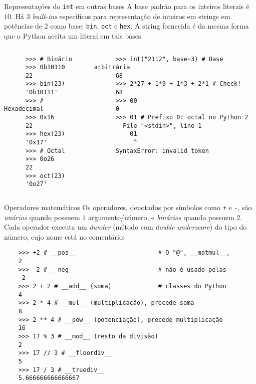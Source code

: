\documentclass[utf8]{beamer}
\begin{document}
\begin{frame}[fragile]{Representações do \texttt{int} em outras bases}
  A base padrão para os inteiros literais é $10$.
  Há $3$ \emph{built-ins} específicos
  para representação de inteiros em strings
  em potências de $2$ como base:
  \texttt{bin},
  \texttt{oct} e
  \texttt{hex}.
  A string fornecida é da mesma forma que o Python aceita
  um literal em tais bases.

  \begin{columns}

    \begin{verbatim}
      >>> # Binário
      >>> 0b10110
      22
      >>> bin(23)
      '0b10111'
      >>> # Hexadecimal
      >>> 0x16
      22
      >>> hex(23)
      '0x17'
      >>> # Octal
      >>> 0o26
      22
      >>> oct(23)
      '0o27'
    \end{verbatim}

    \begin{verbatim}
      >>> int("2112", base=3) # Base arbitrária
      68
      >>> 2*27 + 1*9 + 1*3 + 2*1 # Check!
      68
      >>> 00
      0
      >>> 01 # Prefixo 0: octal no Python 2
        File "<stdin>", line 1
          01
           ^
      SyntaxError: invalid token
    \end{verbatim}

  \end{columns}
\end{frame}


\begin{frame}[fragile]{Operadores matemáticos}
  Os operadores,
  denotados por símbolos como
  \texttt{+} e \texttt{-},
  são \emph{unários} quando possuem $1$ argumento/número,
  e \emph{binários} quando possuem $2$.
  Cada operador executa um \emph{dunder}
  (método com \emph{double underscore}) do tipo do número,
  cujo nome está no comentário:

  \begin{verbatim}
    >>> +2 # __pos__                       # O "@", __matmul__,
    2
    >>> -2 # __neg__                       # não é usado pelas
    -2
    >>> 2 + 2 # __add__ (soma)             # classes do Python
    4
    >>> 2 * 4 # __mul__ (multiplicação), precede soma
    8
    >>> 2 ** 4 # __pow__ (potenciação), precede multiplicação
    16
    >>> 17 % 3 # __mod__ (resto da divisão)
    2
    >>> 17 // 3 # __floordiv__
    5
    >>> 17 / 3 # __truediv__
    5.666666666666667
  \end{verbatim}

\end{frame}
\end{document}
